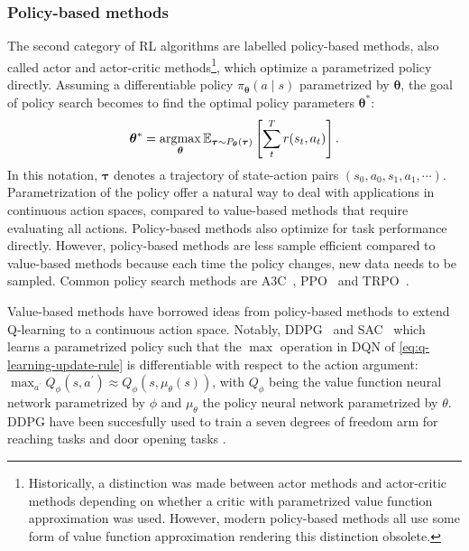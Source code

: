 \documentclass[\home/main.tex]{subfiles}
\begin{document}
\subsubsection{Policy-based methods}
The second category of RL algorithms are labelled policy-based methods, also called actor and actor-critic methods\footnote{Historically, a distinction was made between actor methods and actor-critic methods depending on whether a critic with parametrized value function approximation was used. However, modern policy-based methods all use some form of value function approximation rendering this distinction obsolete.}, which optimize a parametrized policy directly. Assuming a differentiable policy $\pi_{\boldsymbol{\theta}}(a \mid s)$ parametrized by $\boldsymbol{\theta}$, the goal of policy search becomes to find the optimal policy parameters $\boldsymbol{\theta}^{*}$:
\begin{equation} \label{eq:policy-max}
	\boldsymbol{\theta}^{*} = \operatorname*{\arg\!\max}_{\boldsymbol{\theta}} \mathbb{E}_{\boldsymbol{\tau} \sim P_{\boldsymbol{\theta}}(\boldsymbol{\tau}) } \left[ \sum_{t}^{T} r(s_t, a_t) \right].
\end{equation}
In this notation, $\boldsymbol{\tau}$ denotes a trajectory of state-action pairs $(s_0, a_0, s_1, a_1, \cdots)$. Parametrization of the policy offer a natural way to deal with applications in continuous action spaces, compared to value-based methods that require evaluating all actions. Policy-based methods also optimize for task performance directly. However, policy-based methods are less sample efficient compared to value-based methods because each time the policy changes, new data needs to be sampled. Common policy search methods are A3C~\autocite{mnih2016asynchronous}, PPO~\autocite{schulman2017proximal} and TRPO~\autocite{schulman2015trust}.

Value-based methods have borrowed ideas from policy-based methods to extend Q-learning to a continuous action space. Notably, DDPG~\autocite{lillicrap2015continuous} and SAC~\autocite{haarnoja2018soft} which learns a parametrized policy such that the $\max$ operation in \gls{DQN} of \cref{eq:q-learning-update-rule} is differentiable with respect to the action argument: $\max_{a^{\prime}} Q_{\phi}(s, a^{\prime}) \approx Q_{\phi} (s, \mu_{\theta}(s))$, with $Q_{\phi}$ being the value function neural network parametrized by $\phi$ and $\mu_{\theta}$ the policy neural network parametrized by $\theta$. DDPG have been succesfully used to  train a seven degrees of freedom arm for reaching tasks and door opening tasks \autocite{gu2017deep}.
\end{document}
